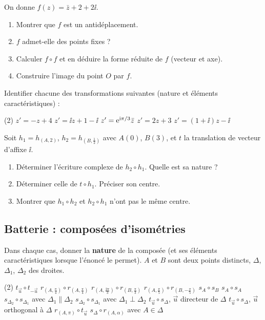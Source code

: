 On donne $f(z) = \bar z + 2 + 2\ii$.
\begin{enumerate}
	\item Montrer que $f$ est un antidéplacement.
	\item $f$ admet-elle des points fixes ?
	\item Calculer $f\circ f$ et en déduire la forme réduite de $f$ (vecteur et
	axe).
	\item Construire l'image du point $O$ par $f$.
\end{enumerate}

Identifier chacune des transformations suivantes (nature et éléments
caractéristiques) :
\begin{listecol}(2)
	\task $z' = -z + 4$
	\task $z' = \ii z + 1 - \ii$
	\task $z' = \mathrm{e}^{\mathrm{i}\pi/3}\bar z$
	\task $z' = 2z + 3$
	\task $z' = (1+\ii)z - \ii$
\end{listecol}

Soit $h_1 = h_{(A,2)}$, $h_2 = h_{(B,\frac12)}$ avec $A(0)$, $B(3)$, et
$t$ la translation de vecteur d'affixe $\ii$.
\begin{enumerate}
	\item Déterminer l'écriture complexe de $h_2\circ h_1$. Quelle est sa
	nature ?
	\item Déterminer celle de $t\circ h_1$. Préciser son centre.
	\item Montrer que $h_1\circ h_2$ et $h_2\circ h_1$ n'ont pas le même centre.
\end{enumerate}

\subsection{Batterie : composées d'isométries}

Dans chaque cas, donner la \textbf{nature} de la composée (et ses éléments
caractéristiques lorsque l'énoncé le permet). $A$ et $B$ sont deux points
distincts, $\Delta$, $\Delta_1$, $\Delta_2$ des droites.
\begin{listecol}(2)
	\task $t_{\vec u}\circ t_{-\vec u}$
	\task $r_{(A,\frac{\pi}{4})}\circ r_{(A,\frac{\pi}{4})}$
	\task $r_{(A,\frac{2\pi}{3})}\circ r_{(B,\frac{\pi}{3})}$
	\task $r_{(A,\frac{\pi}{5})}\circ r_{(B,-\frac{\pi}{5})}$
	\task $s_A\circ s_B$
	\task $s_A\circ s_A$
	\task $s_{\Delta_2}\circ s_{\Delta_1}$ avec $\Delta_1\parallel\Delta_2$
	\task $s_{\Delta_2}\circ s_{\Delta_1}$ avec $\Delta_1\perp\Delta_2$
	\task $t_{\vec u}\circ s_{\Delta}$, $\vec u$ directeur de $\Delta$
	\task $t_{\vec u}\circ s_{\Delta}$, $\vec u$ orthogonal à $\Delta$
	\task $r_{(A,\pi)}\circ t_{\vec u}$
	\task $s_{\Delta}\circ r_{(A,\alpha)}$ avec $A\in\Delta$
\end{listecol}


